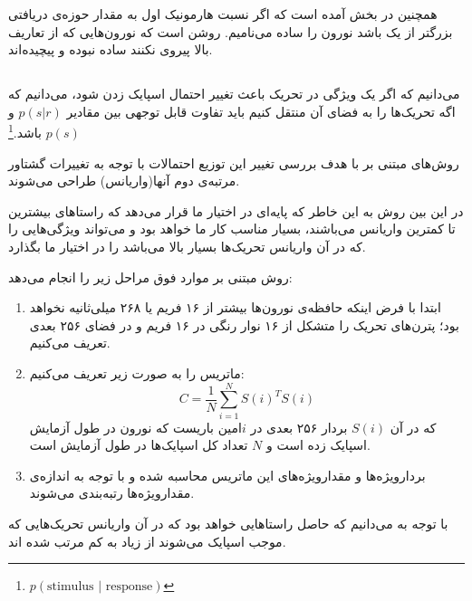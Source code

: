 \documentclass[12pt,onecolumn,a4paper,fleqn]{article}
\begin{document}
همچنین در بخش 
آمده است که اگر نسبت هارمونیک اول به مقدار  حوزه‌ی دریافتی بزرگتر از یک باشد نورون را ساده می‌نامیم. روشن است که نورون‌هایی که از تعاریف بالا پیروی نکنند ساده نبوده و پیچیده‌اند.

\subsection{}
می‌دانیم که اگر یک ویژگی در تحریک باعث تغییر احتمال اسپایک زدن شود، می‌دانیم که اگه تحریک‌ها را به فضای آن  منتقل کنیم باید تفاوت قابل توجهی بین مقادیر $p(s|r)$ و $p(s)$ باشد.\footnote{$p(\text{stimulus\ |\ response})$} 

روش‌های مبتنی بر  با هدف بررسی تغییر این توزیع احتمالات با توجه به تغییرات گشتاور مرتبه‌ی دوم آنها(واریانس) طراحی می‌شوند.

در این بین روش  به این خاطر که پایه‌ای در اختیار ما قرار می‌دهد که راستا‌های بیشترین تا کمترین واریانس می‌باشند، بسیار مناسب کار ما خواهد بود و می‌تواند ویژگی‌هایی را که در آن واریانس تحریک‌ها بسیار بالا می‌باشد را در اختیار ما بگذارد.

روش  مبتنی بر موارد فوق مراحل زیر را انجام می‌دهد:
\begin{enumerate}
	\item ابتدا با فرض اینکه حافظه‌ی نورون‌ها بیشتر از ۱۶ فریم یا ۲۶۸ میلی‌ثانیه نخواهد بود؛ پترن‌های تحریک را متشکل از ۱۶ نوار رنگی در ۱۶ فریم و در فضای ۲۵۶ بعدی تعریف می‌کنیم.	
	\item ماتریس  
	را به صورت زیر تعریف می‌کنیم:
	$$ C = \frac1N \sum_{i = 1}^{N} S(i)^TS(i) $$
	که در آن $S(i)$ بردار ۲۵۶ بعدی در $i$امین باریست که نورون در طول آزمایش اسپایک زده است و $N$ تعداد کل اسپایک‌ها در طول آزمایش است.
	\item بردارویژه‌ها و مقدارویژه‌های این ماتریس محاسبه شده و با توجه به اندازه‌ی مقدار‌ویژ‌ه‌ها رتبه‌بندی می‌شوند.‌	
\end{enumerate}

با توجه به  می‌دانیم که حاصل راستا‌هایی خواهد بود که در آن واریانس تحریک‌هایی که موجب اسپایک می‌شوند از زیاد به کم مرتب شده اند.
	
\end{document}
